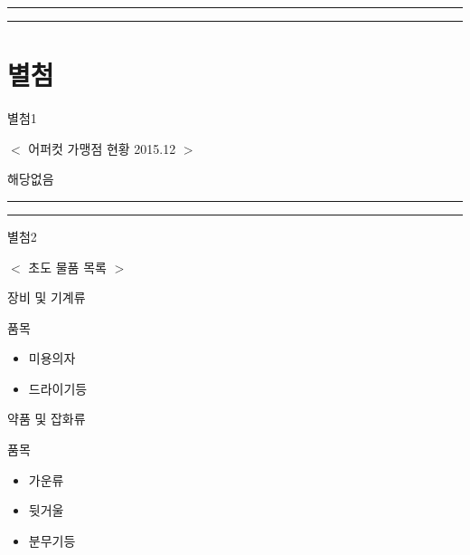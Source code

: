 \documentclass[a5paper,10pt]{oblivoir}
\newcommand\crule[3][black]{\textcolor{#1}{\rule{#2}{#3}}}
\begin{document}
\newpage
\begin{center}
\crule[red]{4cm}{0.1cm} \crule[blue]{4cm}{0.1cm}
\end{center}
\section{별첨}

 별첨1

\begin{center} $<$  어퍼컷 가맹점 현황 2015.12 $>$ \end{center}

 해당없음



\newpage
\begin{center}
\crule[red]{4cm}{0.1cm} \crule[blue]{4cm}{0.1cm}
\end{center}

 별첨2

\begin{center} $<$  초도 물품 목록 $>$ \end{center}

 
\begin{tiny}
\begin{Form}
\def\LayoutCheckField#1#2{%
  \parbox[c][5mm]{5mm}{\centering\footnotesize\strut #1\\#2}%
}
\def\LayoutCheckField#1#2{%
  \makebox[0pt][l]{%
    \makebox[5mm][c]{\footnotesize\strut #1}%
  }%
  #2%
}
\def\DefaultHeightofCheckBox{5mm}
\def\DefaultWidthofCheckBox{5mm}

\rule{0cm}{.5cm}

 장비 및 기계류

\noindent\dotfill 
 품목

\begin{itemize}
\item  미용의자
\item 드라이기등
\end{itemize}


 약품 및 잡화류

\noindent\dotfill 
 품목

\begin{itemize}
\item 가운류
\item 뒷거울
\item 분무기등
\end{itemize}
\end{Form}
\end{tiny}



\end{document}
